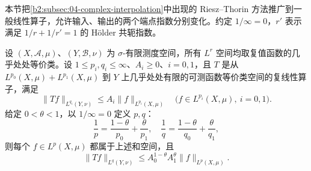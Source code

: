 \ProseParagraphBreak

本节把\cref{b2:subsec:04-complex-interpolation}中出现的 Riesz--Thorin 方法推广到一般线性算子，允许输入、输出的两个端点指数分别变化。约定 \(1/\infty=0\)，\(r'\) 表示满足 \(1/r+1/r'=1\) 的 Hölder 共轭指数。

\begin{theorem}\label{b2:thm:17-riesz-thorin}
设 \((X,\mathcal A,\mu)\)、\((Y,\mathcal B,\nu)\) 为 \(\sigma\)-有限测度空间，所有 \(L^r\) 空间均取复值函数的几乎处处等价类。设 \(1\leq p_i,q_i\leq\infty\)、\(A_i\geq0\)、\(i=0,1\)，且 \(T\) 是从 \(L^{p_0}(X,\mu)+L^{p_1}(X,\mu)\) 到 \(Y\) 上几乎处处有限的可测函数等价类空间的复线性算子，满足
\[
 \|Tf\|_{L^{q_i}(Y,\nu)}\leq A_i\|f\|_{L^{p_i}(X,\mu)}
 \quad\bigl(f\in L^{p_i}(X,\mu),\ i=0,1\bigr).
\]
给定 \(0<\theta<1\)，以 \(1/\infty=0\) 定义 \(p,q\)：
\[
 \dfrac1p=\dfrac{1-\theta}{p_0}+\dfrac\theta{p_1},\quad
 \dfrac1q=\dfrac{1-\theta}{q_0}+\dfrac\theta{q_1},
\]
则每个 \(f\in L^p(X,\mu)\) 都属于上述和空间，且
\[
 \|Tf\|_{L^q(Y,\nu)}
 \leq A_0^{1-\theta}A_1^\theta\|f\|_{L^p(X,\mu)}.
\]
\end{theorem}
